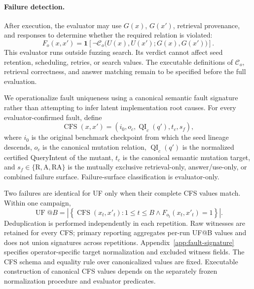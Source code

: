 \paragraph{Failure detection.}
After execution, the evaluator may use \(G(x)\), \(G(x')\), retrieval
provenance, and responses to determine whether the required relation is
violated:
\begin{equation}
F_o(x,x')=
\mathbf{1}\!\left[
\neg\mathcal{C}_o\bigl(U(x),U(x');G(x),G(x')\bigr)
\right].
\label{eq:failure-detection}
\end{equation}
This evaluator runs outside fuzzing search. Its verdict cannot affect seed
retention, scheduling, retries, or search values. The executable definitions
of \(\mathcal{C}_o\), retrieval correctness, and answer matching remain to be
specified before the full evaluation.

We operationalize fault uniqueness using a canonical semantic fault signature
rather than attempting to infer latent implementation root causes. For every
evaluator-confirmed fault, define
\begin{equation}
\operatorname{CFS}(x,x')=(i_0,o_c,\operatorname{QI}_c(q'),t_c,s_f),
\label{eq:cfs}
\end{equation}
where \(i_0\) is the original benchmark checkpoint from which the seed lineage
descends, \(o_c\) is the canonical mutation relation,
\(\operatorname{QI}_c(q')\) is the normalized certified QueryIntent of the
mutant, \(t_c\) is the canonical semantic mutation target, and
\(s_f\in\{\mathrm{R},\mathrm{A},\mathrm{RA}\}\) is the mutually exclusive
retrieval-only, answer/use-only, or combined failure surface. Failure-surface
classification is evaluator-only.

Two failures are identical for UF only when their complete CFS values match.
Within one campaign,
\begin{equation}
\operatorname{UF}@B=
\left|\left\{\operatorname{CFS}(x_t,x'_t):1\leq t\leq B
\land F_{o_t}(x_t,x'_t)=1\right\}\right|.
\label{eq:uf-at-b}
\end{equation}
Deduplication is performed independently in each repetition. Raw witnesses are
retained for every CFS; primary reporting aggregates per-run UF@B values and
does not union signatures across repetitions. Appendix~\ref{app:fault-signature}
specifies operator-specific target normalization and excluded witness fields.
The CFS schema and equality rule over canonicalized values are fixed.
Executable construction of canonical CFS values depends on the separately
frozen normalization procedure and evaluator predicates.

